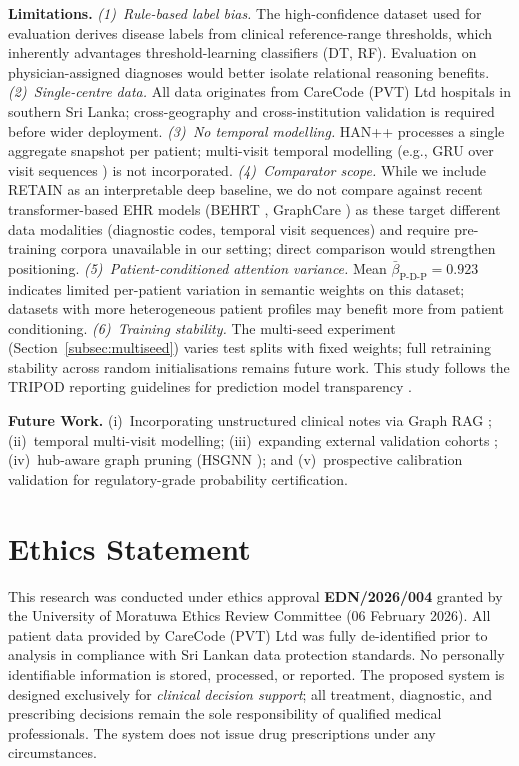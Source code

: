 \documentclass[conference]{IEEEtran}
\begin{document}
\textbf{Limitations.}
\emph{(1)~Rule-based label bias.}
The high-confidence dataset used for evaluation derives disease labels
from clinical reference-range thresholds, which inherently advantages
threshold-learning classifiers (DT, RF).
Evaluation on physician-assigned diagnoses would better isolate
relational reasoning benefits.
\emph{(2)~Single-centre data.}
All data originates from CareCode (PVT) Ltd hospitals in southern
Sri Lanka; cross-geography and cross-institution validation is
required before wider deployment.
\emph{(3)~No temporal modelling.}
HAN++ processes a single aggregate snapshot per patient; multi-visit
temporal modelling (e.g., GRU over visit sequences \cite{li_2021})
is not incorporated.
\emph{(4)~Comparator scope.}
While we include RETAIN as an interpretable deep baseline, we do not
compare against recent transformer-based EHR models
(BEHRT \cite{li_behrt_2020}, GraphCare \cite{jiang_graphcare_2024})
as these target different data modalities (diagnostic codes, temporal
visit sequences) and require pre-training corpora unavailable in our
setting; direct comparison would strengthen positioning.
\emph{(5)~Patient-conditioned attention variance.}
Mean $\bar{\beta}_{\text{P-D-P}} = 0.923$ indicates limited per-patient
variation in semantic weights on this dataset; datasets with more
heterogeneous patient profiles may benefit more from patient conditioning.
\emph{(6)~Training stability.}
The multi-seed experiment (Section~\ref{subsec:multiseed}) varies test
splits with fixed weights; full retraining stability across random
initialisations remains future work.
This study follows the TRIPOD reporting guidelines for prediction model
transparency \cite{collins_2015}.

\textbf{Future Work.}
(i)~Incorporating unstructured clinical notes via Graph RAG \cite{peng_2024};
(ii)~temporal multi-visit modelling;
(iii)~expanding external validation cohorts \cite{riley_2021};
(iv)~hub-aware graph pruning (HSGNN \cite{liu_2020});
and (v)~prospective calibration validation for regulatory-grade
probability certification.

\section*{Ethics Statement}

This research was conducted under ethics approval \textbf{EDN/2026/004}
granted by the University of Moratuwa Ethics Review Committee
(06 February 2026).
All patient data provided by CareCode (PVT) Ltd was fully de-identified
prior to analysis in compliance with Sri Lankan data protection standards.
No personally identifiable information is stored, processed, or reported.
The proposed system is designed exclusively for \emph{clinical decision support};
all treatment, diagnostic, and prescribing decisions remain the sole
responsibility of qualified medical professionals.
The system does not issue drug prescriptions under any circumstances.
\end{document}
